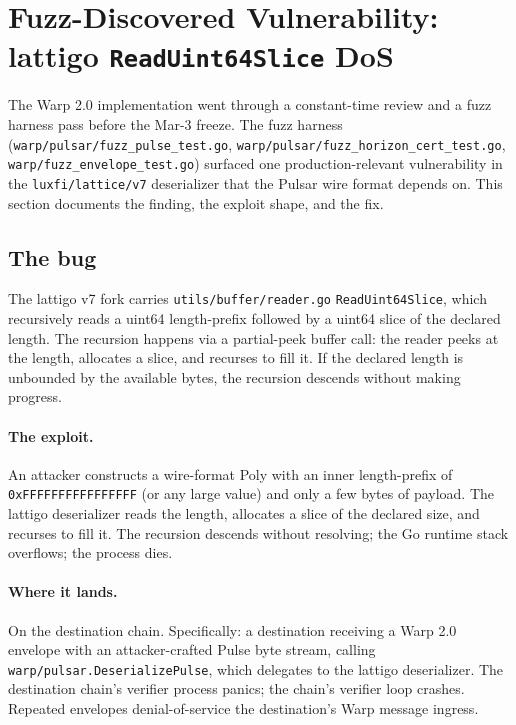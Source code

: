 \section{Fuzz-Discovered Vulnerability: lattigo \texttt{ReadUint64Slice} DoS}
\label{sec:fuzz-vuln}

The Warp 2.0 implementation went through a constant-time review and a fuzz harness pass before the Mar-3 freeze. The fuzz harness (\texttt{warp/pulsar/fuzz\_pulse\_test.go}, \texttt{warp/pulsar/fuzz\_horizon\_cert\_test.go}, \texttt{warp/fuzz\_envelope\_test.go}) surfaced one production-relevant vulnerability in the \texttt{luxfi/lattice/v7} \cite{lattigov7} deserializer that the Pulsar wire format depends on. This section documents the finding, the exploit shape, and the fix.

\subsection{The bug}

The lattigo v7 fork carries \texttt{utils/buffer/reader.go} \texttt{ReadUint64Slice}, which recursively reads a uint64 length-prefix followed by a uint64 slice of the declared length. The recursion happens via a partial-peek buffer call: the reader peeks at the length, allocates a slice, and recurses to fill it. If the declared length is unbounded by the available bytes, the recursion descends without making progress.

\paragraph{The exploit.} An attacker constructs a wire-format Poly with an inner length-prefix of \texttt{0xFFFFFFFFFFFFFFFF} (or any large value) and only a few bytes of payload. The lattigo deserializer reads the length, allocates a slice of the declared size, and recurses to fill it. The recursion descends without resolving; the Go runtime stack overflows; the process dies.

\paragraph{Where it lands.} On the destination chain. Specifically: a destination receiving a Warp 2.0 envelope with an attacker-crafted Pulse byte stream, calling \texttt{warp/pulsar.DeserializePulse}, which delegates to the lattigo deserializer. The destination chain's verifier process panics; the chain's verifier loop crashes. Repeated envelopes denial-of-service the destination's Warp message ingress.

